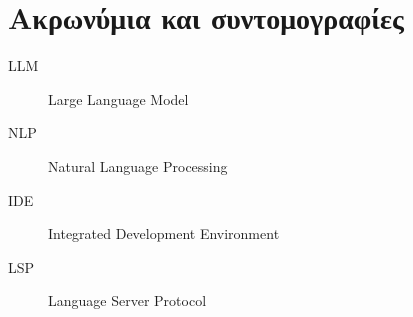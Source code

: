 \chapter{Ακρωνύμια και συντομογραφίες}

\begin{description}
  \item[LLM] Large Language Model
  \item[NLP] Natural Language Processing
  \item[IDE] Integrated Development Environment
  \item[LSP] Language Server Protocol
\end{description}

